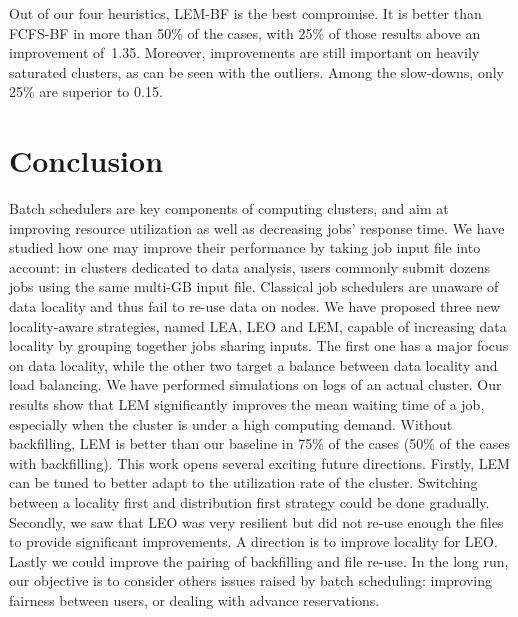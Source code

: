 \documentclass[conference,10pt]{IEEEtran}
\begin{document}
Out of our four heuristics, LEM-BF is the best compromise.
It is better than FCFS-BF in more than 50\% of the cases, 
with 25\% of those results above an improvement of~1.35.
Moreover, improvements are still important on heavily saturated clusters, as can be seen with the outliers.
Among the slow-downs, only 25\% are superior to 0.15.


\section{Conclusion}\label{sec.conclusion}


Batch schedulers are key components of computing clusters, and aim at
improving resource utilization as well as decreasing jobs' response
time. We have studied how one may improve their performance by taking
job input file into account: in clusters dedicated to data analysis,
users commonly submit dozens jobs using the same multi-GB input
file. Classical job schedulers are unaware of data locality and thus
fail to re-use data on nodes. We have proposed three new locality-aware
strategies, named LEA, LEO and LEM,
capable of increasing data locality by grouping together 
jobs sharing inputs. The first one has a major focus on data locality,
while the other two target a balance between data locality and load
balancing. We have performed simulations on logs of an actual
cluster. Our results show that LEM significantly improves the mean
waiting time of a job, especially  
when the cluster is under a high computing demand.
Without backfilling, LEM is better than our baseline in 75\% of the
cases (50\% of the cases with backfilling).
This work opens several exciting future directions.
Firstly, LEM can be tuned to better adapt to the utilization rate of the cluster.
Switching between a locality first and distribution first strategy could be done 
gradually.
Secondly, we saw that LEO was very resilient but did not re-use enough the files to
provide significant improvements. A direction is to 
improve locality for LEO.
Lastly we could improve the pairing of backfilling and file re-use.
In the long run, our objective is to consider others issues raised by batch scheduling:
improving fairness between users, or dealing with advance reservations.
 


\end{document}
